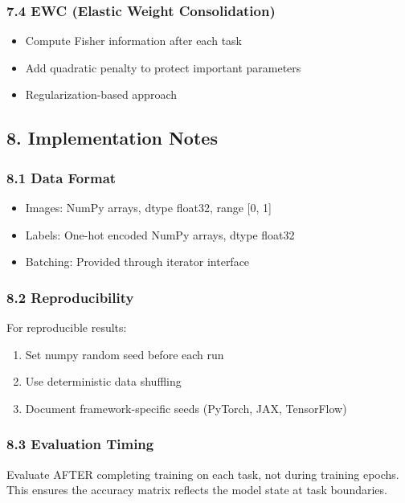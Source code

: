 \documentclass[11pt]{article}
\begin{document}
\subsubsection{7.4 EWC (Elastic Weight Consolidation)}

\begin{itemize}[leftmargin=*]
\item Compute Fisher information after each task
\item Add quadratic penalty to protect important parameters
\item Regularization-based approach
\end{itemize}

\subsection{8. Implementation Notes}

\subsubsection{8.1 Data Format}

\begin{itemize}[leftmargin=*]
\item Images: NumPy arrays, dtype float32, range [0, 1]
\item Labels: One-hot encoded NumPy arrays, dtype float32
\item Batching: Provided through iterator interface
\end{itemize}

\subsubsection{8.2 Reproducibility}

For reproducible results:

\begin{enumerate}[leftmargin=*]
\item Set numpy random seed before each run
\item Use deterministic data shuffling
\item Document framework-specific seeds (PyTorch, JAX, TensorFlow)
\end{enumerate}

\subsubsection{8.3 Evaluation Timing}

Evaluate AFTER completing training on each task, not during training epochs. This ensures the accuracy matrix reflects the model state at task boundaries.
\end{document}
